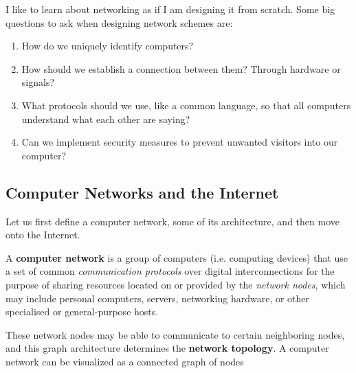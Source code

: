 \documentclass{article}
\begin{document}
  I like to learn about networking as if I am designing it from scratch. Some big questions to ask when designing network schemes are:

  \begin{enumerate}
    \item How do we uniquely identify computers? 
    \item How should we establish a connection between them? Through hardware or signals? 
    \item What protocols should we use, like a common language, so that all computers understand what each other are saying? 
    \item Can we implement security measures to prevent unwanted visitors into our computer? 
  \end{enumerate} 

  \subsection{Computer Networks and the Internet}

    Let us first define a computer network, some of its architecture, and then move onto the Internet. 

    \begin{definition}
      A \textbf{computer network} is a group of computers (i.e. computing devices) that use a set of common \textit{communication protocols} over digital interconnections for the purpose of sharing resources located on or provided by the \textit{network nodes}, which may include personal computers, servers, networking hardware, or other specialised or general-purpose hosts. 

    \end{definition}

    These network nodes may be able to communicate to certain neighboring nodes, and this graph architecture determines the \textbf{network topology}. A computer network can be visualized as a connected graph of nodes 
\end{document}
